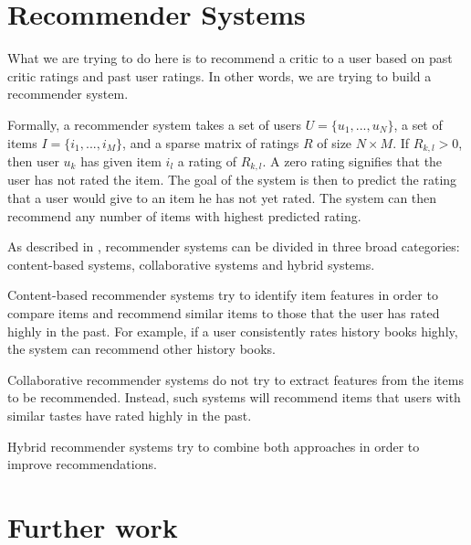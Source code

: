 \documentclass[12pt]{article}
\begin{document}
\section{Recommender Systems}

What we are trying to do here is to recommend a critic to a user based on past
critic ratings and past user ratings. In other words, we are trying to build
a recommender system.

Formally, a recommender system takes a set of users $U = \{u_1, ..., u_N\}$, a
set of items $I = \{i_1, ..., i_M\}$, and a sparse matrix of ratings
$R$ of size $N \times M$. If $R_{k,l} > 0$, then user $u_k$ has given item $i_l$ a rating of $R_{k,l}$. A zero rating signifies that the
user has not rated the item. The goal of the system is then to predict the rating that a user would give to an item he has not yet rated. The system can
then recommend any number of items with highest predicted rating.

As described in \cite{Survey05}, recommender systems can be divided in three broad categories: content-based systems, collaborative systems and hybrid systems. 

Content-based recommender systems try to identify item features in order to compare items and recommend similar items to those that the user has rated highly in the past.  For example, if a user consistently rates history books highly, the system can recommend other history books.

Collaborative recommender systems do not try to extract features from the items
to be recommended. Instead, such systems will recommend items that users with similar tastes have rated highly in the past.

Hybrid recommender systems try to combine both approaches in order to improve recommendations.

\section{Further work}


{}

\end{document}
